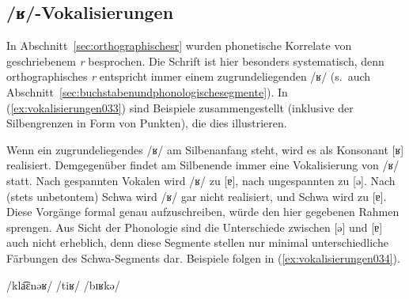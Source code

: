 
\begin{exe}
  \ex\label{ex:verteilungvonund032}
  \begin{xlist}
  \end{xlist}
\end{exe}

\subsection{/ʁ/-Vokalisierungen}
\label{sec:vokalisierungen}

In Abschnitt~\ref{sec:orthographischesr} wurden phonetische Korrelate von geschriebenem \textit{r} besprochen.
Die Schrift ist hier besonders systematisch, denn orthographisches \textit{r} entspricht immer einem zugrundeliegenden /ʁ/ (s.\ auch Abschnitt~\ref{sec:buchstabenundphonologischesegmente}).
In (\ref{ex:vokalisierungen033}) sind Beispiele zusammengestellt (inklusive der Silbengrenzen in Form von Punkten), die dies illustrieren.

\begin{exe}
  \ex\label{ex:vokalisierungen033}
  \begin{xlist}
  \end{xlist}
\end{exe}

Wenn ein zugrundeliegendes /ʁ/ am Silbenanfang steht, wird es als Konsonant [ʁ] realisiert.
Demgegenüber findet am Silbenende immer eine Vokalisierung von /ʁ/ statt.
Nach gespannten Vokalen wird /ʁ/ zu [ɐ], nach ungespannten zu [ə].
Nach (stets unbetontem) Schwa wird /ʁ/ gar nicht realisiert, und Schwa wird zu [ɐ].
Diese Vorgänge formal genau aufzuschreiben, würde den hier gegebenen Rahmen sprengen.
Aus Sicht der Phonologie sind die Unterschiede zwischen [ə] und [ɐ] auch nicht erheblich, denn diese Segmente stellen nur minimal unterschiedliche Färbungen des Schwa-Segments dar.
Beispiele folgen in (\ref{ex:vokalisierungen034}).

\begin{exe}
  \ex \label{ex:vokalisierungen034}
  \begin{xlist}
    \ex /kla͡ɛnəʁ/ \phopro [kla͡ɛ.nɐ]
    \ex /tiʁ/ \phopro [ti͡ɐ]
    \ex /bɪʁkə/ \phopro [bɪ͡ə.kə]
  \end{xlist}
\end{exe}

